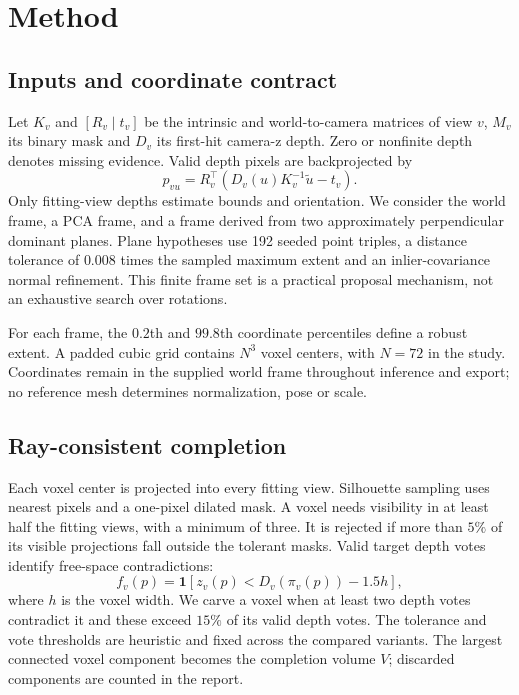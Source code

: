\documentclass[10pt]{article}
\begin{document}
\section{Method}
\subsection{Inputs and coordinate contract}
Let $K_v$ and $[R_v\mid t_v]$ be the intrinsic and world-to-camera matrices of
view $v$, $M_v$ its binary mask and $D_v$ its first-hit camera-z depth. Zero or
nonfinite depth denotes missing evidence. Valid depth pixels are backprojected
by
\begin{equation}
 p_{vu}=R_v^\top\left(D_v(u)K_v^{-1}\widetilde u-t_v\right).
\end{equation}
Only fitting-view depths estimate bounds and orientation. We consider the world
frame, a PCA frame, and a frame derived from two approximately perpendicular
dominant planes. Plane hypotheses use 192 seeded point triples, a distance
tolerance of $0.008$ times the sampled maximum extent and an inlier-covariance
normal refinement. This finite frame set is a practical proposal mechanism,
not an exhaustive search over rotations.

For each frame, the $0.2$th and $99.8$th coordinate percentiles define a robust
extent. A padded cubic grid contains $N^3$ voxel centers, with $N=72$ in the
study. Coordinates remain in the supplied world frame throughout inference and
export; no reference mesh determines normalization, pose or scale.

\subsection{Ray-consistent completion}
Each voxel center is projected into every fitting view. Silhouette sampling uses
nearest pixels and a one-pixel dilated mask. A voxel needs visibility in at least
half the fitting views, with a minimum of three. It is rejected if more than
$5\%$ of its visible projections fall outside the tolerant masks. Valid target
depth votes identify free-space contradictions:
\begin{equation}
 f_v(p)=\mathbf{1}\!\left[z_v(p)<D_v(\pi_v(p))-1.5h\right],
\end{equation}
where $h$ is the voxel width. We carve a voxel when at least two depth votes
contradict it and these exceed $15\%$ of its valid depth votes. The tolerance
and vote thresholds are heuristic and fixed across the compared variants.
The largest connected voxel component becomes the completion volume $V$;
discarded components are counted in the report.
\end{document}

